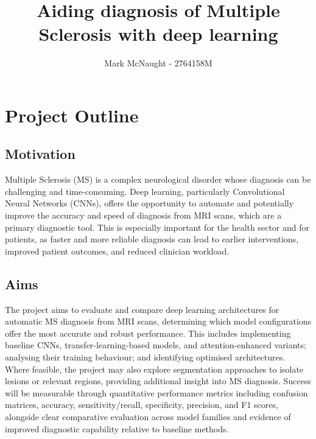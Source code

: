 \documentclass[11pt]{article}
\title{Aiding diagnosis of Multiple Sclerosis with deep learning}
\author{Mark McNaught - 2764158M}
\begin{document}
    \maketitle
    
    
\section*{Project Outline}\label{proposal}

\subsection*{Motivation}\label{motivation}
Multiple Sclerosis (MS) is a complex neurological disorder whose diagnosis can be challenging and 
time-consuming. Deep learning, particularly Convolutional Neural Networks (CNNs), offers the 
opportunity to automate and potentially improve the accuracy and speed of diagnosis from MRI scans, 
which are a primary diagnostic tool. This is especially important for the health sector and for 
patients, as faster and more reliable diagnosis can lead to earlier interventions, improved patient 
outcomes, and reduced clinician workload.



\subsection*{Aims}\label{aims}

The project aims to evaluate and compare deep learning architectures for automatic MS diagnosis 
from MRI scans, determining which model configurations offer the most accurate and robust 
performance. This includes implementing baseline CNNs, transfer-learning-based models, and 
attention-enhanced variants; analysing their training behaviour; and identifying optimised 
architectures. Where feasible, the project may also explore segmentation approaches to isolate 
lesions or relevant regions, providing additional insight into MS diagnosis. Success will be measurable 
through quantitative performance metrics including confusion matrices, accuracy, sensitivity/recall, 
specificity, precision, and F1 scores, alongside clear comparative evaluation across model families 
and evidence of improved diagnostic capability relative to baseline methods.
\end{document}

